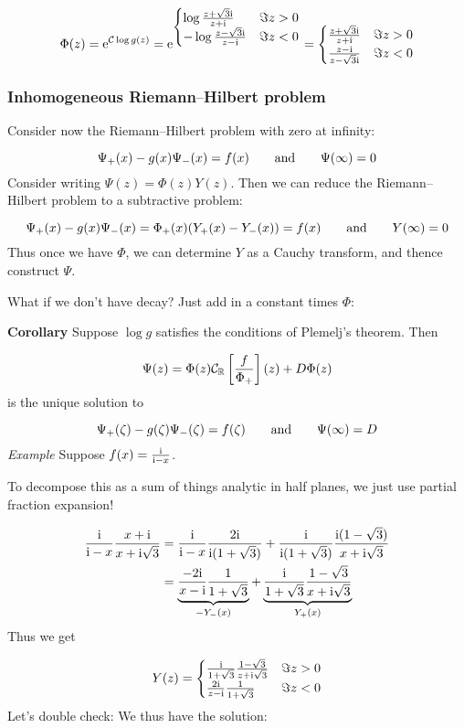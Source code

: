 \documentclass[12pt,a4paper]{article}
\def\qqand{\qquad\hbox{and}\qquad}
\def\I{ {\rm i} }
\def\E{ {\rm e} }
\def\R{ {\mathbb R} }
\def\CC{ {\cal C} }
\def\br[#1]{\left[{#1}\right]}
\def\endash{–}
\begin{document}
\[
\Phi(z) = \E^{\CC\log g(z)} = \E^{\begin{cases}
        \log{z+\sqrt 3 \I \over z+\I} & \Im z > 0 \\
            -\log{z- \sqrt 3\I \over z-\I} & \Im z < 0
           \end{cases}} = \begin{cases}
        {z+ \sqrt 3 \I \over z+\I} & \Im z > 0 \\
            {z-\I \over z-\sqrt 3\I} & \Im z < 0
           \end{cases}
\]
\subsubsection{Inhomogeneous Riemann\ensuremath{\endash}Hilbert problem}
Consider now the  Riemann\ensuremath{\endash}Hilbert problem with zero at infinity:

\[
\Psi_+(x) - g(x)\Psi_-(x) = f(x) \qqand \Psi(\infty) =0
\]
Consider writing $\Psi(z) =  \Phi(z) Y(z)$. Then we can reduce the Riemann\ensuremath{\endash}Hilbert problem to a subtractive problem:

\[
\Psi_+(x) - g(x)\Psi_-(x) = \Phi_+(x)(Y_+(x) - Y_-(x)) = f(x)\qqand Y(\infty) = 0
\]
Thus once we have $\Phi$, we can determine $Y$ as a Cauchy transform, and thence construct $\Psi$.

What if we don't have decay? Just add in a constant times $\Phi$:

\textbf{Corollary} Suppose $\log g$ satisfies the conditions of Plemelj's theorem. Then

\[
\Psi(z) = \Phi(z) \CC_\R\br[{f \over \Phi_+}](z) + D \Phi(z)
\]
is the unique solution to

\[
\Psi_+(\zeta) - g(\zeta)\Psi_-(\zeta) = f(\zeta) \qqand \Psi(\infty) =D
\]
\emph{Example} Suppose $f(x) = {\I \over \I-x}$.

To decompose this as a sum of things analytic in half planes, we just use partial fraction expansion!


\begin{align*}
{\I \over \I-x} {x + \I \over x+ \I \sqrt{3}} &= {\I \over \I-x}{2\I \over \I(1+ \sqrt{3})}  +{\I \over \I(1+\sqrt 3)} {\I(1-\sqrt 3) \over x+ \I \sqrt{3}}\\
&= \underbrace{{-2 \I \over x-\I}{1 \over 1+ \sqrt{3}}}_{-Y_-(x)}  + \underbrace{{\I \over 1+\sqrt 3} {1-\sqrt 3 \over x+ \I \sqrt{3}}}_{Y_+(x)}
\end{align*}
Thus we get

\[
Y(z) = \begin{cases}
{\I \over 1+\sqrt 3} {1-\sqrt 3 \over z+ \I \sqrt{3}} & \Im z > 0 \\
{2 \I \over z-\I}{1 \over 1+ \sqrt{3}} & \Im z < 0
\end{cases}
\]
Let's double check: We thus have the solution:
\end{document}
